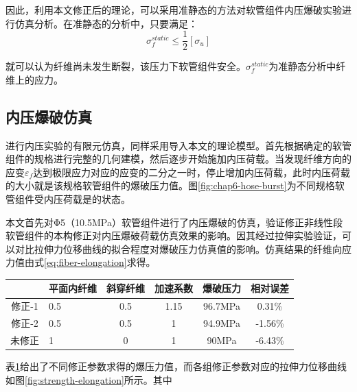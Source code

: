 因此，利用本文修正后的理论，可以采用准静态的方法对软管组件内压爆破实验进行仿真分析。在准静态的分析中，只要满足：
\begin{equation}
{\sigma _f^{static}}  \le \frac{1}{2} \left[ {{\sigma _u}} \right]
\end{equation}

就可以认为纤维尚未发生断裂，该压力下软管组件安全。$ {\sigma _f^{static}} $为准静态分析中纤维上的应力。


\subsection{内压爆破仿真}

进行内压实验的有限元仿真，同样采用\uma 导入本文的理论模型。首先根据确定的软管组件的规格进行完整的几何建模，然后逐步开始施加内压荷载。当发现纤维方向的应变$ \varepsilon_f $达到极限应力对应的应变的二分之一时，停止增加内压荷载，此时内压荷载的大小就是该规格软管组件的爆破压力值。图\ref{fig:chap6-hose-burst}为不同规格软管组件受内压荷载是的状态。



本文首先对Φ5（10.5MPa）软管组件进行了内压爆破的仿真，验证修正非线性段软管组件的本构修正对内压爆破荷载仿真效果的影响。因其经过拉伸实验验证，可以对比拉伸力位移曲线的拟合程度对爆破压力仿真值的影响。仿真结果的纤维向应力值由式\ref{eq:fiber-elongation}求得。


\begin{table}[!htbp]
	\centering
	\label{tab:strength-of-hose-results}
	\begin{tabular}{@{\extracolsep{\fill}}>{\hspace{0.5cm}}clcccc}
		\toprule
		&平面内纤维&斜穿纤维&加速系数&爆破压力&相对误差\\\midrule
		修正-1&0.5&0.5&1.15&96.7MPa&0.31\%\\
		修正-2&0.5&0.5&1&94.9MPa&-1.56\%\\
		未修正&1&0&1&90MPa&-6.43\%\\
		\bottomrule
	\end{tabular} 
\end{table}  


表\ref{tab:strength-of-hose-results}给出了不同修正参数求得的爆压力值，而各组修正参数对应的拉伸力位移曲线如图\ref{fig:strength-elongation}所示。其中


